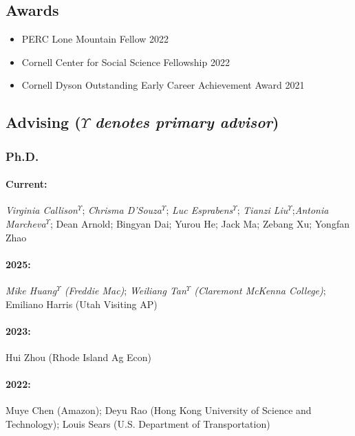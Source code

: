 \documentclass[11pt]{res} %
\begin{document}
\begin{resume}
\vspace{-.2in}

\subsection{Awards}
\begin{itemize} \itemsep -1pt
	\item[] PERC Lone Mountain Fellow \hfill 2022
	\item[] Cornell Center for Social Science Fellowship \hfill 2022
	\item[] Cornell Dyson Outstanding Early Career Achievement Award \hfill 2021
\end{itemize}

\vspace{-.2in}

\subsection{Advising ($\Upsilon$ \textit{denotes primary advisor})  }
\vspace{-.2in}
 
\subsubsection{Ph.D.}\vspace{-.2in}
\paragraph{Current:} \textit{Virginia Callison}$^\Upsilon$; \textit{Chrisma D'Souza}$^\Upsilon$; \textit{Luc Esprabens}$^\Upsilon$; \textit{Tianzi Liu}$^\Upsilon$;\textit{Antonia Marcheva}$^\Upsilon$; Dean Arnold; Bingyan Dai; Yurou He; Jack Ma; Zebang Xu; Yongfan Zhao
\vspace{-.35in}
\paragraph{2025:} \textit{{Mike Huang}$^\Upsilon$ (Freddie Mac)}; \textit{Weiliang Tan$^\Upsilon$ (Claremont McKenna College)}; Emiliano Harris (Utah Visiting AP)
\vspace{-.35in}
\paragraph{2023:} Hui Zhou (Rhode Island Ag Econ)
\vspace{-.35in}
\paragraph{2022:} Muye Chen (Amazon); Deyu Rao (Hong Kong University of Science and Technology); Louis Sears (U.S. Department of Transportation)
\vspace{-.35in}

\end{resume}
\end{document}
